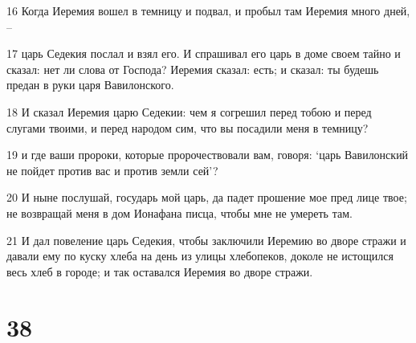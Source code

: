\par 16 Когда Иеремия вошел в темницу и подвал, и пробыл там Иеремия много дней, --
\par 17 царь Седекия послал и взял его. И спрашивал его царь в доме своем тайно и сказал: нет ли слова от Господа? Иеремия сказал: есть; и сказал: ты будешь предан в руки царя Вавилонского.
\par 18 И сказал Иеремия царю Седекии: чем я согрешил перед тобою и перед слугами твоими, и перед народом сим, что вы посадили меня в темницу?
\par 19 и где ваши пророки, которые пророчествовали вам, говоря: `царь Вавилонский не пойдет против вас и против земли сей'?
\par 20 И ныне послушай, государь мой царь, да падет прошение мое пред лице твое; не возвращай меня в дом Ионафана писца, чтобы мне не умереть там.
\par 21 И дал повеление царь Седекия, чтобы заключили Иеремию во дворе стражи и давали ему по куску хлеба на день из улицы хлебопеков, доколе не истощился весь хлеб в городе; и так оставался Иеремия во дворе стражи.

\chapter{38}

